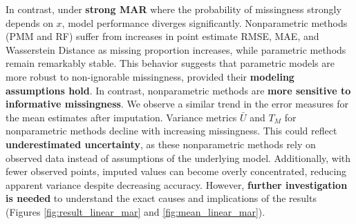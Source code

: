 \documentclass[12pt,oneside]{amsart}
\theoremstyle{definition}
\theoremstyle{remark}
\numberwithin{equation}{section}
\begin{document}
In contrast, under \textbf{strong MAR} where the probability of missingness strongly depends on $x$, model performance diverges significantly. Nonparametric methods (PMM and RF) suffer from increases in point estimate RMSE, MAE, and Wasserstein Distance as missing proportion increases, while parametric methods remain remarkably stable. This behavior suggests that parametric models are more robust to non-ignorable missingness, provided their \textbf{modeling assumptions hold}. In contrast, nonparametric methods are \textbf{more sensitive to informative missingness}. We observe a similar trend in the error measures for the mean estimates after imputation. Variance metrics $\bar{U}$ and $T_M$ for nonparametric methods decline with increasing missingness. This could reflect \textbf{underestimated uncertainty}, as these nonparametric methods rely on observed data instead of assumptions of the underlying model. Additionally, with fewer observed points, imputed values can become overly concentrated, reducing apparent variance despite decreasing accuracy. However, \textbf{further investigation is needed} to understand the exact causes and implications of the results  (Figures \ref{fig:result_linear_mar} and  \ref{fig:mean_linear_mar}). \\
\end{document}
